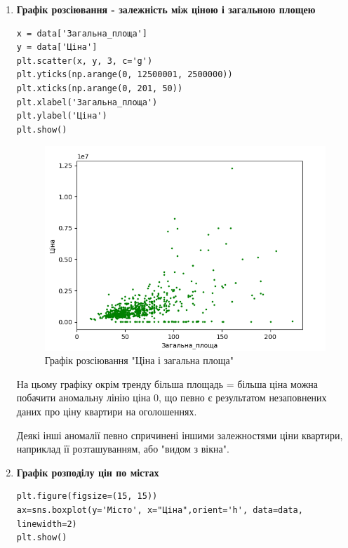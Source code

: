 \documentclass[oneside,14pt,a4paper]{extreport}
\begin{document}
\begin{enumerate}
\item \textbf{Графік розсіювання - залежність між ціною і загальною площею}

\small
\begin{verbatim}
x = data['Загальна_площа']
y = data['Ціна']
plt.scatter(x, y, 3, c='g')
plt.yticks(np.arange(0, 12500001, 2500000))
plt.xticks(np.arange(0, 201, 50))
plt.xlabel('Загальна_площа')
plt.ylabel('Ціна')
plt.show()
\end{verbatim}

\newpage
\begin{figure}[!htb]
 \centering
 \includegraphics[scale=1.0]{graph_4}
 \caption{Графік розсіювання "Ціна і загальна площа"} 
\end{figure}

На цьому графіку окрім тренду більша площадь = більша ціна можна побачити аномальну лінію ціна 0, що певно є результатом незаповнених даних про ціну квартири на оголошеннях.

Деякі інші аномалії певно спричинені іншими залежностями ціни квартири, наприклад її розташуванням, або "видом з вікна".

\item \textbf{Графік розподілу цін по містах}

\small
\begin{verbatim}
plt.figure(figsize=(15, 15))
ax=sns.boxplot(y='Місто', x="Ціна",orient='h', data=data, linewidth=2)
plt.show()
\end{verbatim}


\end{enumerate}
\end{document}
